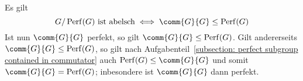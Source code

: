 Es gilt
\[
        \text{$G/\Perf{G}$ ist abelsch}
  \iff  \comm{G}{G} \subgroup \Perf{G}
\]
Ist nun $\comm{G}{G}$ perfekt, so gilt  $\comm{G}{G} \subgroup \Perf{G}$.
Gilt andererseits $\comm{G}{G} \subgroup \Perf{G}$, so gilt nach Aufgabenteil~\ref{subsection: perfect subgroup contained in commutator} auch $\Perf{G} \subgroup \comm{G}{G}$ und somit $\comm{G}{G} = \Perf{G}$;
inbesondere ist $\comm{G}{G}$ dann perfekt.
































